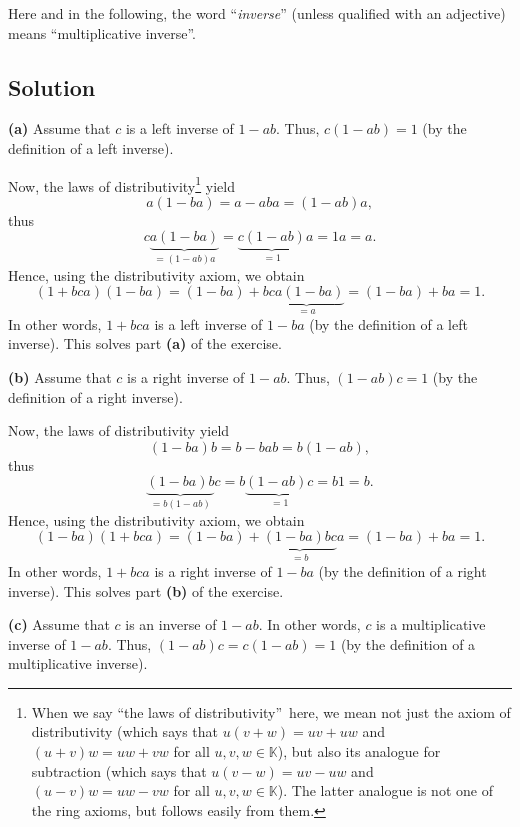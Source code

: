 \documentclass[paper=a4, fontsize=12pt]{scrartcl}%
\theoremstyle{plainsl}
\theoremstyle{definition}
\theoremstyle{remark}
\begin{document}
Here and in the following, the word ``\textit{inverse}'' (unless qualified
with an adjective) means ``multiplicative inverse''.

\subsection{Solution}

\textbf{(a)} Assume that $c$ is a left inverse of $1-ab$. Thus, $c\left(
1-ab\right)  =1$ (by the definition of a left inverse).

Now, the laws of distributivity\footnote{When we say \textquotedblleft the
laws of distributivity\textquotedblright\ here, we mean not just the axiom of
distributivity (which says that $u\left(  v+w\right)  =uv+uw$ and $\left(
u+v\right)  w=uw+vw$ for all $u,v,w\in\mathbb{K}$), but also its analogue for
subtraction (which says that $u\left(  v-w\right)  =uv-uw$ and $\left(
u-v\right)  w=uw-vw$ for all $u,v,w\in\mathbb{K}$). The latter analogue is not
one of the ring axioms, but follows easily from them.} yield%
\[
a\left(  1-ba\right)  =a-aba=\left(  1-ab\right)  a,
\]
thus%
\[
c\underbrace{a\left(  1-ba\right)  }_{=\left(  1-ab\right)  a}%
=\underbrace{c\left(  1-ab\right)  }_{=1}a=1a=a.
\]
Hence, using the distributivity axiom, we obtain%
\[
\left(  1+bca\right)  \left(  1-ba\right)  =\left(  1-ba\right)
+b\underbrace{ca\left(  1-ba\right)  }_{=a}=\left(  1-ba\right)  +ba=1.
\]
In other words, $1+bca$ is a left inverse of $1-ba$ (by the definition of a
left inverse). This solves part \textbf{(a)} of the exercise.

\bigskip

\textbf{(b)} Assume that $c$ is a right inverse of $1-ab$. Thus, $\left(
1-ab\right)  c=1$ (by the definition of a right inverse).

Now, the laws of distributivity yield%
\[
\left(  1-ba\right)  b=b-bab=b\left(  1-ab\right)  ,
\]
thus%
\[
\underbrace{\left(  1-ba\right)  b}_{=b\left(  1-ab\right)  }%
c=b\underbrace{\left(  1-ab\right)  c}_{=1}=b1=b.
\]
Hence, using the distributivity axiom, we obtain%
\[
\left(  1-ba\right)  \left(  1+bca\right)  =\left(  1-ba\right)
+\underbrace{\left(  1-ba\right)  bc}_{=b}a=\left(  1-ba\right)  +ba=1.
\]
In other words, $1+bca$ is a right inverse of $1-ba$ (by the definition of a
right inverse). This solves part \textbf{(b)} of the exercise.

\bigskip

\textbf{(c)} Assume that $c$ is an inverse of $1-ab$. In other words, $c$ is a
multiplicative inverse of $1-ab$. Thus, $\left(  1-ab\right)  c=c\left(
1-ab\right)  =1$ (by the definition of a multiplicative inverse).
\end{document}
